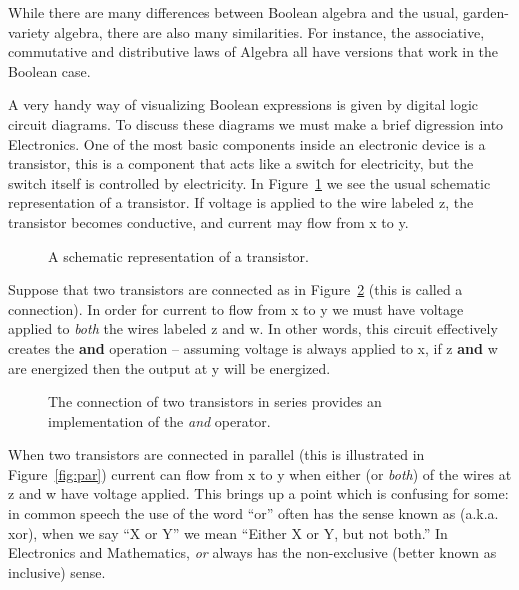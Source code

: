 While there are many differences between Boolean algebra and the
usual, garden-variety algebra, there are also many similarities.
For instance, the associative, 
commutative and 
distributive laws
of Algebra all have versions that work in the Boolean case.

A very handy way of visualizing Boolean expressions is given by
digital logic circuit diagrams.  To discuss these diagrams we 
must make a brief digression into Electronics.  One of the most
basic components inside an electronic device is a 
transistor,
this is a component that acts like a switch for electricity,
but the switch itself is controlled by electricity.  In Figure~\ref{fig:trans}
we see the usual schematic representation of a transistor.  If voltage
is applied to the wire labeled z, the transistor becomes conductive,
and current may flow from x to y.  

\begin{figure}[!hbtp] 
\begin{center}

\end{center}
\caption{A schematic representation of a transistor.}
\label{fig:trans}
\end{figure}

Suppose that two transistors are connected as in Figure~\ref{fig:series}
(this is called a  connection).  
In order for current to flow
from x to y we must have voltage applied to {\em both} the wires labeled
z and w.  In other words, this circuit effectively creates the {\bf and} 
operation --  assuming voltage is always applied to x, if z {\bf and} w
are energized then the output at y will be energized.

\begin{figure}[!hbtp] 
\begin{center}

\end{center}
\caption[Series connections implement \emph{and}.]{%
The connection of two transistors in series provides %
an implementation of the {\em and} operator.}
\label{fig:series}
\end{figure}

When two transistors are connected in parallel (this is illustrated in
Figure~\ref{fig:par}) current can flow from x to y when either (or {\em both})
of the wires at z and w have voltage applied.  This brings up a point
which is confusing for some: in common speech the use of the word ``or'' often
has the sense known as  (a.k.a. xor), when we say ``X or Y''
we mean ``Either X or Y, but not both.''  In Electronics and Mathematics,
{\em or} always has the non-exclusive (better known as 
inclusive) sense.

